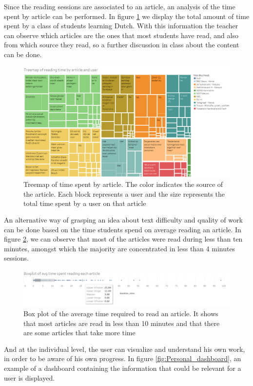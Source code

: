 Since the reading sessions are associated to an article, an analysis of the time spent by article can be performed. In figure \ref{fig:treemap_by_article} we display the total amount of time spent by a class of students learning Dutch. With this information the teacher can observe which articles are the ones that most students have read, and also from which source they read, so a further discussion in class about the content can be done.

\begin{figure}[h]
	\centering
	\includegraphics[width=0.7\linewidth]{gfx/Treemap_by_article}
	\caption{Treemap of time spent by article. The color indicates the source of the article. Each block represents a user and the size represents the total time spent by a user on that article}
	\label{fig:treemap_by_article}
\end{figure}

An alternative way of grasping an idea about text difficulty and quality of work can be done based on the time students spend on average reading an article. In figure \ref{fig:boxplot_by_article}, we can observe that most of the articles were read during less than ten minutes, amongst which the majority are concentrated in less than 4 minutes sessions.

\begin{figure}[h]
	\centering
	\includegraphics[width=0.7\linewidth]{gfx/avg_time_spent_by_article}
	\caption{Box plot of the average time required to read an article. It shows that most articles are read in less than 10 minutes and that there are some articles that take more time}
	\label{fig:boxplot_by_article}
\end{figure}

And at the individual level, the user can visualize and understand his own work, in order to be aware of his own progress. In figure \ref{fig:Personal_dashboard}, an example of a dashboard containing the information that could be relevant for a user is displayed.

